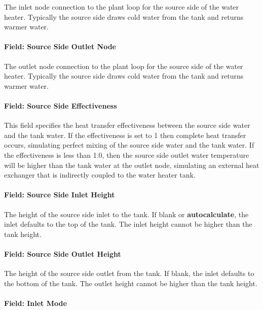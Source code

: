The inlet node connection to the plant loop for the source side of the water heater. Typically the source side draws cold water from the tank and returns warmer water.

\paragraph{Field: Source Side Outlet Node}\label{field-source-side-outlet-node}

The outlet node connection to the plant loop for the source side of the water heater. Typically the source side draws cold water from the tank and returns warmer water.

\paragraph{Field: Source Side Effectiveness}\label{field-source-side-effectiveness-1}

This field specifies the heat transfer effectiveness between the source side water and the tank water. If the effectiveness is set to 1 then complete heat transfer occurs, simulating perfect mixing of the source side water and the tank water. If the effectiveness is less than 1.0, then the source side outlet water temperature will be higher than the tank water at the outlet node, simulating an external heat exchanger that is indirectly coupled to the water heater tank.

\paragraph{Field: Source Side Inlet Height}\label{field-source-side-inlet-height-000}

The height of the source side inlet to the tank. If blank or \textbf{autocalculate}, the inlet defaults to the top of the tank. The inlet height cannot be higher than the tank height.

\paragraph{Field: Source Side Outlet Height}\label{field-source-side-outlet-height-000}

The height of the source side outlet from the tank. If blank, the inlet defaults to the bottom of the tank. The outlet height cannot be higher than the tank height.

\paragraph{Field: Inlet Mode}\label{field-inlet-mode-000}

